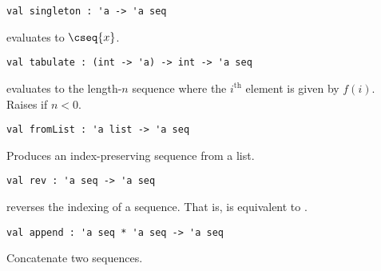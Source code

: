 \begin{cluster}
\label{grp:gr:singleton}

\begin{gram}[singleton]
\label{gr:singleton}
\begin{verbatim}
val singleton : 'a -> 'a seq
\end{verbatim}
 evaluates to $\cseq{x}$.

\end{gram}
\end{cluster}

\begin{cluster}
\label{grp:gr:tabulate}

\begin{gram}[tabulate]
\label{gr:tabulate}
\begin{verbatim}
val tabulate : (int -> 'a) -> int -> 'a seq
\end{verbatim}
 evaluates to the length-$n$ sequence where the $i^\text{th}$
element is given by $f(i)$. Raises  if $n < 0$.

\end{gram}
\end{cluster}

\begin{cluster}
\label{grp:gr:fromList}

\begin{gram}[fromList]
\label{gr:fromList}
\begin{verbatim}
val fromList : 'a list -> 'a seq
\end{verbatim}
Produces an index-preserving sequence from a list.

\end{gram}
\end{cluster}

\begin{cluster}
\label{grp:gr:rev}

\begin{gram}[rev]
\label{gr:rev}
\begin{verbatim}
val rev : 'a seq -> 'a seq
\end{verbatim}
 reverses the indexing of a sequence. That is, 
is equivalent to .

\end{gram}
\end{cluster}

\begin{cluster}
\label{grp:gr:append}

\begin{gram}[append]
\label{gr:append}
\begin{verbatim}
val append : 'a seq * 'a seq -> 'a seq
\end{verbatim}
Concatenate two sequences.

\end{gram}
\end{cluster}

